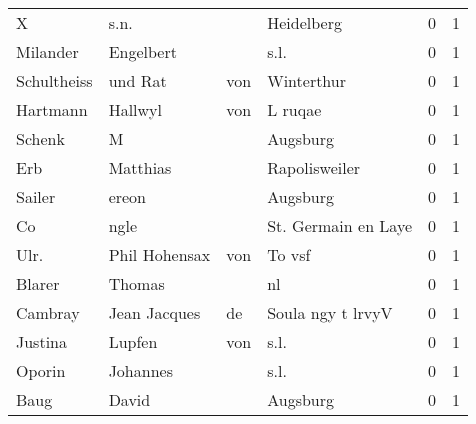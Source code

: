 \documentclass[10pt,a4paper,landscape]{article}
\begin{document}
\begin{longtable}{llllrr}
                        X &                               s.n. &             &                                  Heidelberg &          0 &         1 \\
                 Milander &                          Engelbert &             &                                        s.l. &          0 &         1 \\
              Schultheiss &                            und Rat &         von &                                  Winterthur &          0 &         1 \\
                 Hartmann &                            Hallwyl &         von &                                     L ruqae &          0 &         1 \\
                   Schenk &                                  M &             &                                    Augsburg &          0 &         1 \\
                      Erb &                           Matthias &             &                               Rapolisweiler &          0 &         1 \\
                   Sailer &                              ereon &             &                                    Augsburg &          0 &         1 \\
                       Co &                               ngle &             &                         St. Germain en Laye &          0 &         1 \\
                     Ulr. &                     Phil  Hohensax &         von &                                      To vsf &          0 &         1 \\
                   Blarer &                             Thomas &             &                                          nl &          0 &         1 \\
                  Cambray &                       Jean Jacques &          de &                           Soula ngy t lrvyV &          0 &         1 \\
                  Justina &                             Lupfen &         von &                                        s.l. &          0 &         1 \\
                   Oporin &                           Johannes &             &                                        s.l. &          0 &         1 \\
                     Baug &                              David &             &                                    Augsburg &          0 &         1 \\

\end{longtable}
\end{document}
